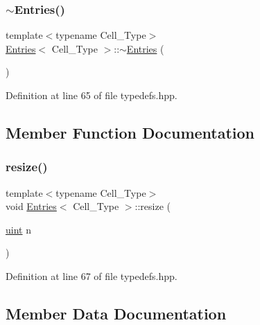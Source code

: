 \mbox{\label{class_entries_aeda42186376731bd3a9b3902a09395a4}} 
\subsubsection{\texorpdfstring{$\sim$\+Entries()}{~Entries()}}
{\footnotesize\ttfamily template$<$typename Cell\+\_\+\+Type$>$ \\
\hyperlink{class_entries}{Entries}$<$ Cell\+\_\+\+Type $>$\+::$\sim$\hyperlink{class_entries}{Entries} (\begin{DoxyParamCaption}{ }\end{DoxyParamCaption})\hspace{0.3cm}{\ttfamily [inline]}}



Definition at line 65 of file typedefs.\+hpp.



\subsection{Member Function Documentation}
\mbox{\label{class_entries_a8b539e4c53aab5d6ce8305af346b7089}} 
\subsubsection{\texorpdfstring{resize()}{resize()}}
{\footnotesize\ttfamily template$<$typename Cell\+\_\+\+Type$>$ \\
void \hyperlink{class_entries}{Entries}$<$ Cell\+\_\+\+Type $>$\+::resize (\begin{DoxyParamCaption}\item[{\hyperlink{typedefs_8hpp_a91ad9478d81a7aaf2593e8d9c3d06a14}{uint}}]{n }\end{DoxyParamCaption})\hspace{0.3cm}{\ttfamily [inline]}}



Definition at line 67 of file typedefs.\+hpp.



\subsection{Member Data Documentation}
\mbox{\label{class_entries_a6a7c589df4cd6ea98386466440dfdc98}} 
